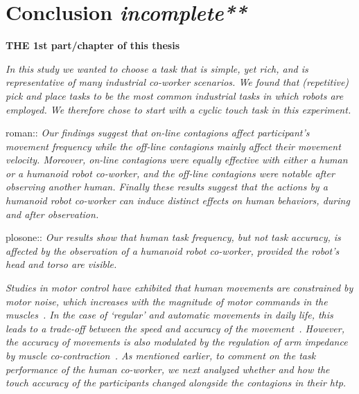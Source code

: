 
{\color{blue}\chapter*{Conclusion \textit{incomplete**}}}
\pagestyle{plain}

\textbf{THE 1st part/chapter of this thesis}


\textit{In this study we wanted to choose a task that is simple, yet rich, and is representative of many industrial co-worker scenarios. We found that (repetitive) pick and place tasks to be the most common industrial tasks in which robots are employed. We therefore chose to start with a cyclic touch task in this experiment.}

roman::\textit{ Our findings suggest that on-line contagions affect participant's movement frequency while the \textit{off-line} contagions mainly affect their movement velocity. Moreover, on-line contagions were equally effective with either a human or a humanoid robot co-worker, and the \textit{off-line} contagions were notable after observing another human. Finally these results suggest that the actions by a humanoid robot co-worker can induce distinct effects on human behaviors, during and after observation.}


plosone:: \textit{Our results show that human task frequency, but not task accuracy, is affected by the observation of a humanoid robot co-worker, provided the robot's head and torso are visible.
}




\textit{Studies in motor control have exhibited that human movements are constrained by motor noise, which increases with the magnitude of motor commands in the muscles~\cite{Harris:Nature:1998}. In the case of `regular' and automatic movements in daily life, this leads to a trade-off between the speed and accuracy of the movement~\cite{Fitts:JEP:1954}. However, the accuracy of movements is also modulated by the regulation of arm impedance by muscle co-contraction~\cite{Burdet:nature:2001, Franklin:JoN:2008, Ganesh:RAS:2013}. As mentioned earlier, to comment on the task performance of the human co-worker, we next analyzed whether and how the touch accuracy of the participants changed alongside the contagions in their {\it htp}. 
}

